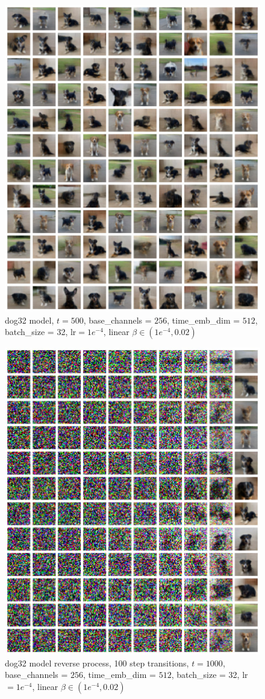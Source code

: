 \documentclass[12pt]{article}
\begin{document}
\begin{figure}[H]
  \centering
  \includegraphics[width=1\textwidth]{dog32ext.jpg}
  \caption{dog32 model, $t=500$, base\_channels = $256$, time\_emb\_dim = $512$, batch\_size = 32, lr$=1e^{-4}$, linear $\beta \in(1e^{-4}, 0.02)$}
\end{figure}

\begin{figure}[H]
  \centering
  \includegraphics[width=1\textwidth]{dog32rev.jpg}
  \caption{dog32 model reverse process, 100 step transitions, $t=1000$, base\_channels = $256$, time\_emb\_dim = $512$, batch\_size = 32, lr$=1e^{-4}$, linear $\beta \in(1e^{-4}, 0.02)$}
\end{figure}
\end{document}
